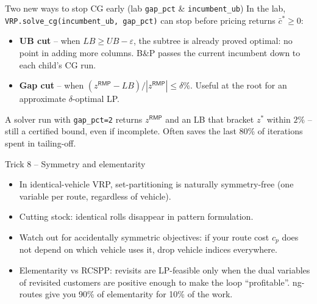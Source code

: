 \documentclass[10pt,aspectratio=169]{beamer}
\newcommand{\rmp}{\mathsf{RMP}}
\newcommand{\redcost}{\bar{c}}
\begin{document}
\begin{frame}{Two new ways to stop CG early (lab \texttt{gap\_pct} \& \texttt{incumbent\_ub})}
  In the lab, \texttt{VRP.solve\_cg(incumbent\_ub, gap\_pct)} can stop
  before pricing returns $\redcost^*\ge 0$:
  \begin{itemize}\small
    \item \textbf{UB cut} -- when $LB\ge UB-\varepsilon$, the
          subtree is already proved optimal: no point in adding more columns.
          B\&P passes the current incumbent down to each child's CG run.
    \item \textbf{Gap cut} -- when $(z^{\rmp}-LB)/|z^{\rmp}|\le\delta\%$.
          Useful at the root for an approximate $\delta$-optimal LP.
  \end{itemize}
  \begin{keybox}
    A solver run with \texttt{gap\_pct=2} returns $z^{\rmp}$ and an LB
    that bracket $z^*$ within $2\%$ -- still a certified bound, even if
    incomplete. Often saves the last 80\% of iterations spent in
    tailing-off.
  \end{keybox}
\end{frame}

\begin{frame}{Trick 8 -- Symmetry and elementarity}
  \begin{itemize}\small
    \item In identical-vehicle VRP, set-partitioning is naturally
          \alert{symmetry-free} (one variable per route, regardless of vehicle).
    \item Cutting stock: identical rolls disappear in pattern formulation.
    \item Watch out for accidentally symmetric objectives: if your route cost
          $c_p$ does not depend on which vehicle uses it, drop vehicle indices
          everywhere.
    \item Elementarity vs RCSPP: revisits are LP-feasible only when the dual
          variables of revisited customers are positive enough to make the
          loop ``profitable''. ng-routes give you 90\% of elementarity for
          10\% of the work.
  \end{itemize}
\end{frame}
\end{document}
